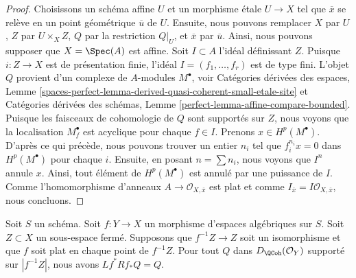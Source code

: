\begin{proof}
Choisissons un schéma affine $U$ et un morphisme \'etale $U \to X$ tel que $\overline{x}$ se relève en un point géométrique $\overline{u}$ de $U$. Ensuite, nous pouvons remplacer $X$ par $U$, $Z$ par $U \times_X Z$, $Q$ par la restriction $Q|_U$, et $\overline{x}$ par $\overline{u}$. Ainsi, nous pouvons supposer que $X = \Spec(A)$ est affine. Soit $I \subset A$ l'idéal définissant $Z$. Puisque $i : Z \to X$ est de présentation finie, l'idéal $I = (f_1, \ldots, f_r)$ est de type fini. L'objet $Q$ provient d'un complexe de $A$-modules $M^\bullet$, voir Catégories dérivées des espaces, Lemme \ref{spaces-perfect-lemma-derived-quasi-coherent-small-etale-site} et Catégories dérivées des schémas, Lemme \ref{perfect-lemma-affine-compare-bounded}. Puisque les faisceaux de cohomologie de $Q$ sont supportés sur $Z$, nous voyons que la localisation $M^\bullet_f$ est acyclique pour chaque $f \in I$. Prenons $x \in H^p(M^\bullet)$. D'après ce qui précède, nous pouvons trouver un entier $n_i$ tel que $f_i^{n_i} x = 0$ dans $H^p(M^\bullet)$ pour chaque $i$. Ensuite, en posant $n = \sum n_i$, nous voyons que $I^n$ annule $x$. Ainsi, tout élément de $H^p(M^\bullet)$ est annulé par une puissance de $I$. Comme l'homomorphisme d'anneaux $A \to \mathcal{O}_{X, \overline{x}}$ est plat et comme $I_{\overline{x}} = I\mathcal{O}_{X, \overline{x}}$, nous concluons. 
\end{proof}

\begin{lemma}
\label{lemma-formal-glueing-on-closed}
Soit $S$ un schéma. Soit $f : Y \to X$ un morphisme d'espaces algébriques sur $S$. Soit $Z \subset X$ un sous-espace fermé. Supposons que $f^{-1}Z \to Z$ soit un isomorphisme et que $f$ soit plat en chaque point de $f^{-1}Z$. Pour tout $Q$ dans $D_\QCoh(\mathcal{O}_Y)$ supporté sur $|f^{-1}Z|$, nous avons $Lf^*Rf_*Q = Q$.
\end{lemma}

